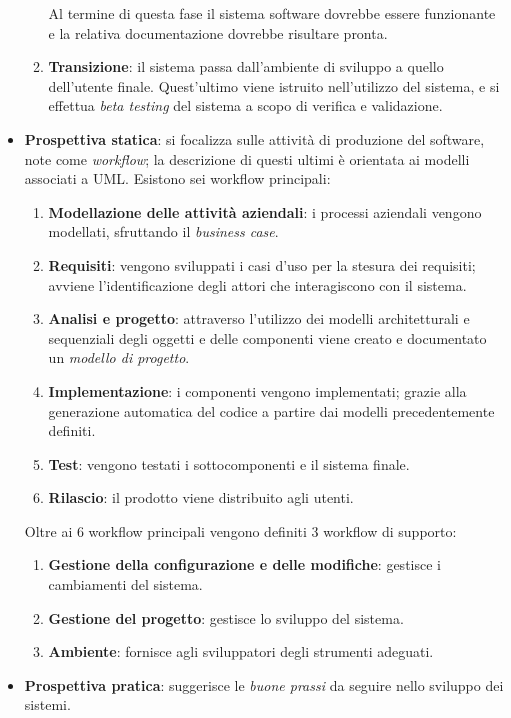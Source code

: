 \begin{solution}
\begin{itemize}
\begin{enumerate}
		Al termine di questa fase il sistema software dovrebbe essere funzionante e la relativa documentazione dovrebbe risultare pronta.
		\item \textbf{Transizione}: il sistema passa dall'ambiente di sviluppo a quello dell'utente finale. Quest'ultimo viene istruito nell'utilizzo del sistema, e si effettua \textit{beta testing} del sistema a scopo di verifica e validazione.
	\end{enumerate}
	\item \textbf{Prospettiva statica}: si focalizza sulle attività di produzione del software, note come \textit{workflow}; la descrizione di questi ultimi è orientata ai modelli associati a UML.
	Esistono sei workflow principali:
	\begin{enumerate}
		\item \textbf{Modellazione delle attività aziendali}: i processi aziendali vengono modellati, sfruttando il \textit{business case}.
		\item \textbf{Requisiti}: vengono sviluppati i casi d'uso per la stesura dei requisiti; avviene l'identificazione degli attori che interagiscono con il sistema.
		\item \textbf{Analisi e progetto}: attraverso l'utilizzo dei modelli architetturali e sequenziali degli oggetti e delle componenti viene creato e documentato un \textit{modello di progetto}.
		\item \textbf{Implementazione}: i componenti vengono implementati; grazie alla generazione automatica del codice a partire dai modelli precedentemente definiti.
		\item \textbf{Test}: vengono testati i sottocomponenti e il sistema finale.
		\item \textbf{Rilascio}: il prodotto viene distribuito agli utenti.
	\end{enumerate}
	Oltre ai 6 workflow principali vengono definiti 3 workflow di supporto:
	\begin{enumerate}
		\item \textbf{Gestione della configurazione e delle modifiche}: gestisce i cambiamenti del sistema.
		\item \textbf{Gestione del progetto}: gestisce lo sviluppo del sistema.
		\item \textbf{Ambiente}: fornisce agli sviluppatori degli strumenti adeguati.
	\end{enumerate}
	\item \textbf{Prospettiva pratica}: suggerisce le \textit{buone prassi} da seguire nello sviluppo dei sistemi.

\end{itemize}
\end{solution}
